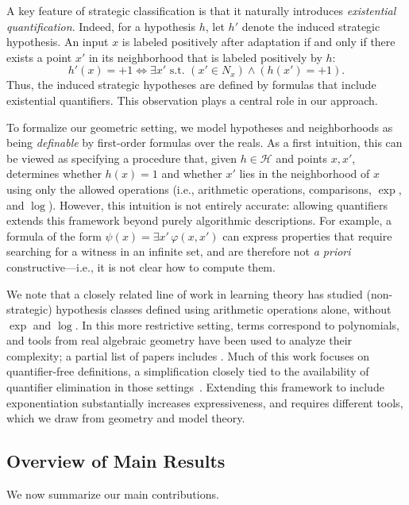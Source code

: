 \documentclass[11pt]{article}
\theoremstyle{plain}
\theoremstyle{definition}
\theoremstyle{remark}
\begin{document}
A key feature of strategic classification is that it naturally introduces \emph{existential quantification}.
Indeed, for a hypothesis $h$, let $h'$ denote the induced strategic hypothesis.
An input $x$ is labeled positively after adaptation
if and only if there exists a point $x'$ in its neighborhood
that is labeled positively by $h$:
\begin{equation}\label{eq:exists}
 h'(x)=+1 \iff \exists x' \text{ s.t. } (x' \in N_x) \wedge (h(x')=+1).
\end{equation}
Thus, the induced strategic hypotheses are defined by formulas
that include existential quantifiers.
This observation plays a central role in our approach.


To formalize our geometric setting, we model hypotheses and neighborhoods
as being \emph{definable} by first-order formulas over the reals.
As a first intuition, this can be viewed as specifying a procedure that,
given $h \in \mathcal{H}$ and points $x,x'$,
determines whether $h(x)=1$ and whether $x'$ lies in the neighborhood of $x$
using only the allowed operations (i.e., arithmetic operations, comparisons, $\exp$, and $\log$).
However, this intuition is not entirely accurate:
allowing quantifiers extends this framework beyond purely algorithmic descriptions.
For example, a formula of the form $\psi(x)=\exists x'\,\varphi(x,x')$
can express properties that require searching for a witness in an infinite set,
and are therefore not \emph{a priori} constructive---i.e., it is not clear how to compute them.

We note that a closely related line of work in learning theory has studied (non-strategic) hypothesis classes
defined using arithmetic operations alone, without $\exp$ and $\log$.
In this more restrictive setting, terms correspond to polynomials,
and tools from real algebraic geometry have been used to analyze their complexity; a partial list of papers includes
\citep{ben1993localization,Goldberg1995,bartlett98,Ben-DavidES02,AlonMY16,bartlett19,Alon23}.
Much of this work focuses on quantifier-free definitions,
a simplification closely tied to the availability of quantifier elimination
in those settings~\cite{tarski1951decision}.
Extending this framework to include exponentiation substantially increases expressiveness,
and requires different tools, which we draw from geometry and model theory.

\subsection{Overview of Main Results}
We now summarize our main contributions.
\end{document}
